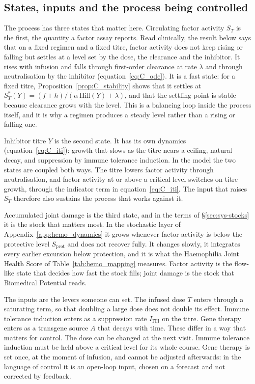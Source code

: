 \subsection{States, inputs and the process being controlled}

The process has three states that matter here. Circulating factor activity $S_T$ is the first, the quantity a factor assay reports. Read clinically, the result below says that on a fixed regimen and a fixed titre, factor activity does not keep rising or falling but settles at a level set by the dose, the clearance and the inhibitor. It rises with infusion and falls through first-order clearance at rate $\lambda$ and through neutralisation by the inhibitor (equation~\eqref{eq:C_ode}). It is a fast state: for a fixed titre, Proposition~\ref{prop:C_stability} shows that it settles at $S_T^\ast(Y)=(f+h)/(\alpha\,\mathrm{Hill}(Y)+\lambda)$, and that the settling point is stable because clearance grows with the level. This is a balancing loop inside the process itself, and it is why a regimen produces a steady level rather than a rising or falling one.

Inhibitor titre $Y$ is the second state. It has its own dynamics (equation~\eqref{eq:C_iti}): growth that slows as the titre nears a ceiling, natural decay, and suppression by immune tolerance induction. In the model the two states are coupled both ways. The titre lowers factor activity through neutralisation, and factor activity at or above a critical level switches on titre growth, through the indicator term in equation~\eqref{eq:C_iti}. The input that raises $S_T$ therefore also sustains the process that works against it.

Accumulated joint damage is the third state, and in the terms of \S\ref{sec:sys-stocks} it is the stock that matters most. In the stochastic layer of Appendix~\ref{app:hemo_dynamics} it grows whenever factor activity is below the protective level $S_{\text{prot}}$ and does not recover fully. It changes slowly, it integrates every earlier excursion below protection, and it is what the Haemophilia Joint Health Score of Table~\ref{tab:hemo_mapping} measures. Factor activity is the flow-like state that decides how fast the stock fills; joint damage is the stock that Biomedical Potential reads.

The inputs are the levers someone can set. The infused dose $T$ enters through a saturating term, so that doubling a large dose does not double its effect. Immune tolerance induction enters as a suppression rate $I_{\text{ITI}}$ on the titre. Gene therapy enters as a transgene source $A$ that decays with time. These differ in a way that matters for control. The dose can be changed at the next visit. Immune tolerance induction must be held above a critical level for its whole course. Gene therapy is set once, at the moment of infusion, and cannot be adjusted afterwards: in the language of control it is an open-loop input, chosen on a forecast and not corrected by feedback.

